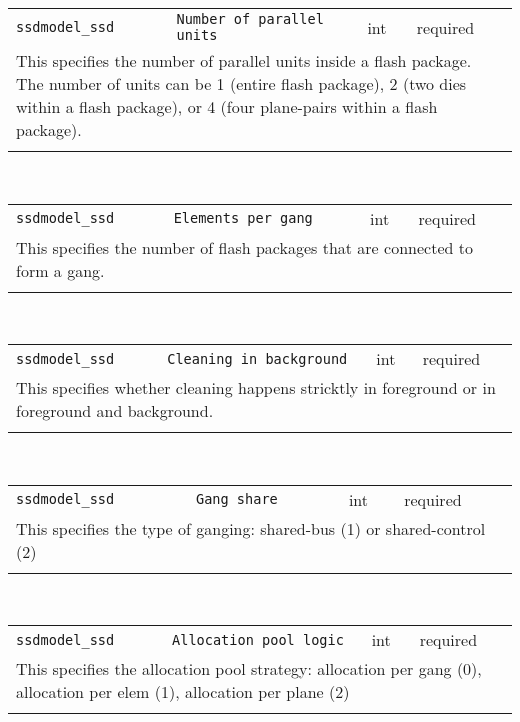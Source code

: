 \noindent 
\begin{tabular}{|p{\lpmodwidth}|p{\lpnamewidth}|p{0.5in}|p{0.5in}|}
\cline{1-4}
\texttt{ssdmodel\_ssd} & \texttt{Number of parallel units} & int & required \\ 
\cline{1-4}
\multicolumn{4}{|p{6in}|}{
This specifies the number of parallel units inside a flash package.
The number of units can be 1 (entire flash package), 2 (two dies within
a flash package), or 4 (four plane-pairs within a flash package).
}\\ 
\cline{1-4}
\multicolumn{4}{p{5in}}{}\\
\end{tabular}\\ 
\noindent 
\begin{tabular}{|p{\lpmodwidth}|p{\lpnamewidth}|p{0.5in}|p{0.5in}|}
\cline{1-4}
\texttt{ssdmodel\_ssd} & \texttt{Elements per gang} & int & required \\ 
\cline{1-4}
\multicolumn{4}{|p{6in}|}{
This specifies the number of flash packages that are connected to
form a gang.
}\\ 
\cline{1-4}
\multicolumn{4}{p{5in}}{}\\
\end{tabular}\\ 
\noindent 
\begin{tabular}{|p{\lpmodwidth}|p{\lpnamewidth}|p{0.5in}|p{0.5in}|}
\cline{1-4}
\texttt{ssdmodel\_ssd} & \texttt{Cleaning in background} & int & required \\ 
\cline{1-4}
\multicolumn{4}{|p{6in}|}{
This specifies whether cleaning happens stricktly in foreground
or in foreground and background.
}\\ 
\cline{1-4}
\multicolumn{4}{p{5in}}{}\\
\end{tabular}\\ 
\noindent 
\begin{tabular}{|p{\lpmodwidth}|p{\lpnamewidth}|p{0.5in}|p{0.5in}|}
\cline{1-4}
\texttt{ssdmodel\_ssd} & \texttt{Gang share} & int & required \\ 
\cline{1-4}
\multicolumn{4}{|p{6in}|}{
This specifies the type of ganging: shared-bus (1) or shared-control (2)
}\\ 
\cline{1-4}
\multicolumn{4}{p{5in}}{}\\
\end{tabular}\\ 
\noindent 
\begin{tabular}{|p{\lpmodwidth}|p{\lpnamewidth}|p{0.5in}|p{0.5in}|}
\cline{1-4}
\texttt{ssdmodel\_ssd} & \texttt{Allocation pool logic} & int & required \\ 
\cline{1-4}
\multicolumn{4}{|p{6in}|}{
This specifies the allocation pool strategy: allocation per gang (0),
allocation per elem (1), allocation per plane (2)
}\\ 
\cline{1-4}
\multicolumn{4}{p{5in}}{}\\
\end{tabular}\\ 
